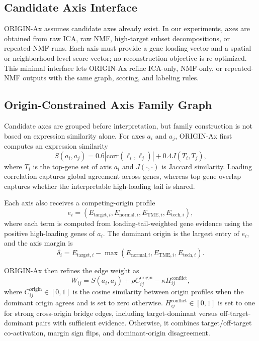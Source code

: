 \documentclass[conference]{IEEEtran}
\begin{document}
\subsection{Candidate Axis Interface}

ORIGIN-Ax assumes candidate axes already exist. In our experiments, axes are
obtained from raw ICA, raw NMF, high-target subset decompositions, or
repeated-NMF runs. Each axis must provide a gene loading vector and a spatial or
neighborhood-level score vector; no reconstruction objective is re-optimized.
This minimal interface lets ORIGIN-Ax refine ICA-only, NMF-only, or repeated-NMF
outputs with the same graph, scoring, and labeling rules.

\subsection{Origin-Constrained Axis Family Graph}

Candidate axes are grouped before interpretation, but family construction is
not based on expression similarity alone. For axes $a_i$ and $a_j$, ORIGIN-Ax
first computes an expression similarity
\begin{equation}
S(a_i,a_j)=0.6|\mathrm{corr}(\ell_i,\ell_j)|+0.4J(T_i,T_j),
\end{equation}
where $T_i$ is the top-gene set of axis $a_i$ and $J(\cdot,\cdot)$ is Jaccard
similarity. Loading correlation captures global agreement across genes,
whereas top-gene overlap captures whether the interpretable high-loading tail
is shared.

Each axis also receives a competing-origin profile
\begin{equation}
e_i=(E_{\mathrm{target},i},E_{\mathrm{normal},i},
E_{\mathrm{TME},i},E_{\mathrm{tech},i}),
\end{equation}
where each term is computed from loading-tail-weighted gene evidence using
the positive high-loading genes of $a_i$. The dominant origin is the largest
entry of $e_i$, and the axis margin is
\[
\delta_i=E_{\mathrm{target},i}
-\max(E_{\mathrm{normal},i},E_{\mathrm{TME},i},E_{\mathrm{tech},i}).
\]

ORIGIN-Ax then refines the edge weight as
\begin{equation}
W_{ij}=S(a_i,a_j)+\rho C^{\mathrm{origin}}_{ij}
-\kappa H^{\mathrm{conflict}}_{ij},
\end{equation}
where $C^{\mathrm{origin}}_{ij}\in[0,1]$ is the cosine similarity between
origin profiles when the dominant origin agrees and is set to zero otherwise.
$H^{\mathrm{conflict}}_{ij}\in[0,1]$ is set to one for strong cross-origin
bridge edges, including target-dominant versus off-target-dominant pairs with
sufficient evidence. Otherwise, it combines target/off-target co-activation,
margin sign flips, and dominant-origin disagreement.
\end{document}
